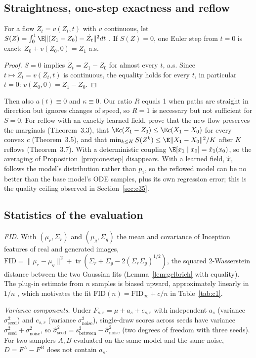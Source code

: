 \subsection{Straightness, one-step exactness and reflow}\label{app:d7}
\begin{proposition}\label{prop:straight}
For a flow $\dot Z_t=v(Z_t,t)$ with $v$ continuous, let $S(Z)=\int_0^1\E\|(Z_1-Z_0)-\dot Z_t\|^2dt$ \citep{liu2023rf}. If $S(Z)=0$, one Euler step from $t=0$ is exact: $Z_0+v(Z_0,0)=Z_1$ a.s.
\end{proposition}
\begin{proof}
$S=0$ implies $\dot Z_t=Z_1-Z_0$ for almost every $t$, a.s. Since $t\mapsto\dot Z_t=v(Z_t,t)$ is continuous, the equality holds for every $t$, in particular $t=0$: $v(Z_0,0)=Z_1-Z_0$.
\end{proof}
Then also $a(t)\equiv0$ and $\kappa\equiv0$. Our ratio $R$ equals 1 when paths are straight in direction but ignores changes of speed, so $R=1$ is necessary but not sufficient for $S=0$. For reflow with an exactly learned field, \citet{liu2023rf} prove that the new flow preserves the marginals (Theorem~3.3), that $\E c(Z_1-Z_0)\le\E c(X_1-X_0)$ for every convex $c$ (Theorem~3.5), and that $\min_{k\le K}S(Z^k)\le\E\|X_1-X_0\|^2/K$ after $K$ reflows (Theorem~3.7). With a deterministic coupling $\E[x_1\mid x_0]=\hat x_1(x_0)$, so the averaging of Proposition~\ref{prop:onestep} disappears. With a learned field, $\hat x_1$ follows the model's distribution rather than $p_1$, so the reflowed model can be no better than the base model's ODE samples, plus its own regression error; this is the quality ceiling observed in Section~\ref{sec:c35}.

\subsection{Statistics of the evaluation}\label{app:d8}
\emph{FID.} With $(\mu_r,\Sigma_r)$ and $(\mu_g,\Sigma_g)$ the mean and covariance of Inception features \citep{szegedy2016inception} of real and generated images, $\mathrm{FID}=\|\mu_r-\mu_g\|^2+\operatorname{tr}(\Sigma_r+\Sigma_g-2(\Sigma_r\Sigma_g)^{1/2})$, the squared 2-Wasserstein distance between the two Gaussian fits (Lemma~\ref{lem:gelbrich} with equality). The plug-in estimate from $n$ samples is biased upward, approximately linearly in $1/n$ \citep{chong2020fid}, which motivates the fit $\mathrm{FID}(n)=\mathrm{FID}_\infty+c/n$ in Table~\ref{tab:c1}.

\emph{Variance components.} Under $F_{s,r}=\mu+a_s+e_{s,r}$ with independent $a_s$ (variance $\sigma^2_{\text{seed}}$) and $e_{s,r}$ (variance $\sigma^2_{\text{noise}}$), single-draw scores across seeds have variance $\sigma^2_{\text{seed}}+\sigma^2_{\text{noise}}$, so $\hat\sigma^2_{\text{seed}}=s^2_{\text{between}}-\hat\sigma^2_{\text{noise}}$ (two degrees of freedom with three seeds). For two samplers $A,B$ evaluated on the same model and the same noise, $D=F^A-F^B$ does not contain $a_s$.

